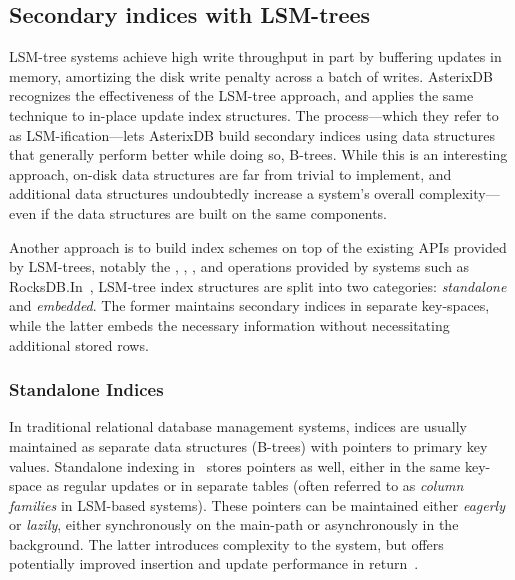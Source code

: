 
\subsection{Secondary indices with LSM-trees}

LSM-tree systems achieve high write throughput in part by buffering updates in
memory, amortizing the disk write penalty across a batch of writes.
AsterixDB~\cite{asterix-storage} recognizes the effectiveness of the LSM-tree
approach, and applies the same technique to in-place update index structures.
The process---which they refer to as LSM-ification---lets AsterixDB build
secondary indices using data structures that generally perform better while
doing so, \eg B-trees. While this is an interesting approach, on-disk data
structures are far from trivial to implement, and additional data structures
undoubtedly increase a system's overall complexity---even if the data structures
are built on the same components.

Another approach is to build index schemes on top of the existing APIs provided
by LSM-trees, notably the , , , and 
operations provided by systems such as RocksDB.\@ In~\cite{lsm-comparison},
LSM-tree index structures are split into two categories: \textit{standalone}
and \textit{embedded}. The former maintains secondary indices in separate
key-spaces, while the latter embeds the necessary information without
necessitating additional stored rows.

\subsubsection{Standalone Indices}

In traditional relational database management systems, indices are usually
maintained as separate data structures (\eg B-trees) with pointers to primary
key values. Standalone indexing in~\cite{lsm-comparison} stores pointers as
well, either in the same key-space as regular updates or in separate tables
(often referred to as \textit{column families} in LSM-based systems). These
pointers can be maintained either \textit{eagerly} or \textit{lazily}, \eg
either synchronously on the main-path or asynchronously in the background. The
latter introduces complexity to the system, but offers potentially improved
insertion and update performance in return~\cite{deli, pnuts}.

